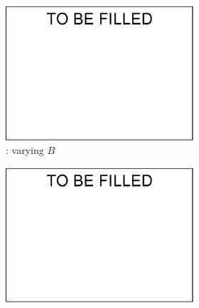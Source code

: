 {\begin{figure}[tb!]
\begin{subfigure}[b]{1.00\textwidth}
\begin{subfigure}[b]{0.245\textwidth}
\begin{center}
            \label{tpcds-1-vary-join} 
          \end{center}
          \vspace{-1ex}
        \end{subfigure}
  		\begin{subfigure}[b]{0.245\textwidth}
          \centering
          \includegraphics[width=1\textwidth]{fig/a.eps}
          \begin{center}
            \vspace{-2ex}\caption{\tpcds: varying $B$}
            \label{tpcds-1-varyB} 
          \end{center}
          \vspace{-1ex}
        \end{subfigure}
  		\begin{subfigure}[b]{0.245\textwidth}
          \centering
          \includegraphics[width=1\textwidth]{fig/a.eps}

\end{subfigure}
\end{subfigure}
\end{figure}}
